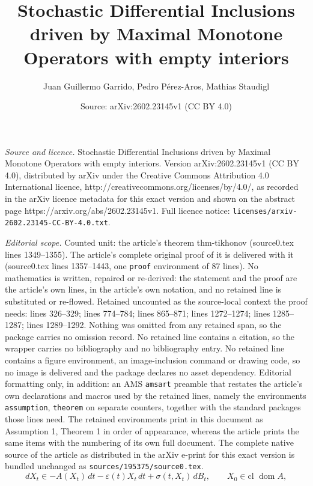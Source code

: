 \documentclass[10pt,a4paper]{amsart}
\title{Stochastic Differential Inclusions driven by Maximal Monotone Operators with empty interiors}
\author{Juan Guillermo Garrido, Pedro P\'erez-Aros, Mathias Staudigl}
\date{Source: arXiv:2602.23145v1 (CC BY 4.0)}
\newcommand{\cl}{{\text{cl }}}
\newcommand{\dom}{\operatorname{dom}}
\renewcommand{\epsilon}{\varepsilon}
\begin{document}
\maketitle

\noindent\emph{Source and licence.} Stochastic Differential Inclusions driven by Maximal Monotone Operators with empty interiors. Version arXiv:2602.23145v1 (CC BY 4.0), distributed by arXiv under the Creative Commons Attribution 4.0 International licence, http://creativecommons.org/licenses/by/4.0/, as recorded in the arXiv licence metadata for this exact version and shown on the abstract page https://arxiv.org/abs/2602.23145v1. Full licence notice: \texttt{licenses/arxiv-2602.23145-CC-BY-4.0.txt}.\par\smallskip

\noindent\textit{Editorial scope.} Counted unit: the article's theorem thm-tikhonov (source0.tex lines 1349--1355). The article's complete original proof of it is delivered with it (source0.tex lines 1357--1443, one \texttt{proof} environment of 87 lines). No mathematics is written, repaired or re-derived: the statement and the proof are the article's own lines, in the article's own notation, and no retained line is substituted or re-flowed.  Retained uncounted as the source-local context the proof needs: lines 326--329; lines 774--784; lines 865--871; lines 1272--1274; lines 1285--1287; lines 1289--1292.  Nothing was omitted from any retained span, so the package carries no omission record.  No retained line contains a citation, so the wrapper carries no bibliography and no bibliography entry.  No retained line contains a figure environment, an image-inclusion command or drawing code, so no image is delivered and the package declares no asset dependency.  Editorial formatting only, in addition: an AMS \texttt{amsart} preamble that restates the article's own declarations and macros used by the retained lines, namely the environments \texttt{assumption}, \texttt{theorem} on separate counters, together with the standard packages those lines need.  The retained environments print in this document as Assumption 1, Theorem 1 in order of appearance, whereas the article prints the same items with the numbering of its own full document.  The complete native source of the article as distributed in the arXiv e-print for this exact version is bundled unchanged as \texttt{sources/195375/source0.tex}.
\begin{equation}\label{tikhonov-system}
    dX_t \in -A(X_t)\,dt - \epsilon(t) X_t\,dt + \sigma(t,X_t)\,dB_t,
    \qquad X_0 \in \cl \dom A,
\end{equation}
\end{document}
